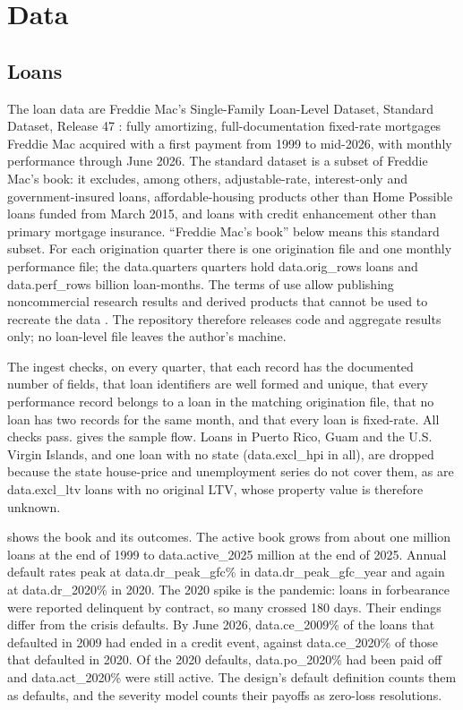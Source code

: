 \section{Data}\label{sec:data}

\subsection{Loans}

The loan data are Freddie Mac's Single-Family Loan-Level Dataset, Standard
Dataset, Release 47 \citep{FreddieGuide2026}: fully amortizing, full-documentation
fixed-rate mortgages Freddie Mac acquired with a first payment from 1999 to
mid-2026, with monthly performance through June 2026. The standard dataset is
a subset of Freddie Mac's book: it excludes, among others, adjustable-rate,
interest-only and government-insured loans, affordable-housing products other
than Home Possible loans funded from March 2015, and loans with credit
enhancement other than primary mortgage insurance. ``Freddie Mac's book''
below means this standard subset.
For each origination quarter there is one origination file and one monthly
performance file; the \num{data.quarters} quarters hold \num{data.orig_rows}
loans and \num{data.perf_rows} billion loan-months. The terms of use allow publishing
noncommercial research results and derived products that cannot be used to
recreate the data \citep{FreddieTerms2025}. The repository therefore releases code and aggregate
results only; no loan-level file leaves the author's machine.

The ingest checks, on every quarter, that each record has the documented
number of fields, that loan identifiers are well formed and unique, that every
performance record belongs to a loan in the matching origination file, that no
loan has two records for the same month, and that every loan is fixed-rate.
All checks pass.  gives the sample flow. Loans in Puerto Rico,
Guam and the U.S. Virgin Islands, and one loan with no state (\num{data.excl_hpi}
in all), are dropped because the state house-price and unemployment series do
not cover them, as are
\num{data.excl_ltv} loans with no original LTV, whose property value is
therefore unknown.



 shows the book and its outcomes. The active book grows from
about one million loans at the end of 1999 to \num{data.active_2025} million
at the end of 2025. Annual default rates peak at \num{data.dr_peak_gfc}\% in
\num{data.dr_peak_gfc_year} and again at \num{data.dr_2020}\% in 2020. The
2020 spike is the pandemic: loans in forbearance were reported delinquent by
contract, so many crossed 180 days. Their endings differ from the crisis
defaults. By June 2026, \num{data.ce_2009}\% of the loans that defaulted in
2009 had ended in a credit event, against \num{data.ce_2020}\% of those that
defaulted in 2020. Of the 2020 defaults, \num{data.po_2020}\% had been paid off
and \num{data.act_2020}\% were still active. The design's default definition
counts them as defaults, and the severity model counts their payoffs as
zero-loss resolutions.

